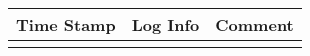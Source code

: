 \documentclass[journal, onecolumn, 12pt]{IEEEtran}
\begin{document}
\vspace{.5cm}
\begin{table}[h]
	\centering
	\begin{tabular}{|P{2cm}|P{2cm}|P{13cm}|}
		\hline
		\textbf{Time Stamp}         & \textbf{Log Info}           & \textbf{Comment}            \\ \hline
		 &  &  \\
		&                    &                    \\
		&                    &                    \\
		&                    &                    \\
		&                    &                    \\
		&                    &                    \\
		&                    &                    \\
		&                    &                    \\
		&                    &                    \\
		&                    &                    \\
		&                    &                    \\		
		&                    &                    \\
		&                    &                    \\
		&                    &                    \\
		&                    &                    \\
		&                    &                    \\	
		&                    &                    \\
		&                    &                    \\
		&                    &                    \\
		&                    &                    \\	
		&                    &                    \\
		&                    &                    \\
		&                    &                    \\
		&                    &                    \\
		&                    &                    \\		
		&                    &                    \\

\end{tabular}
\end{table}
\end{document}

